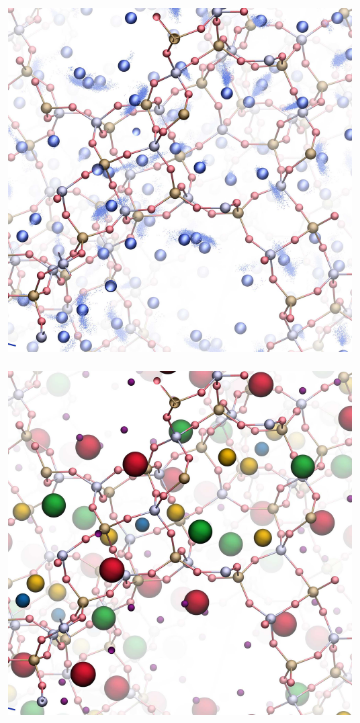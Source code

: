 \documentclass[thesis]{subfiles}
\begin{document}
\begin{otherlanguage}{french}
\begin{figure}[ht]
	\hfill\begin{subfigure}{0.45\columnwidth}
		\centering
		\includegraphics[width=0.95\columnwidth]{figures/cations/FAU1_density_Na.jpg}
	\end{subfigure}\hfill%
	\begin{subfigure}{0.45\columnwidth}
		\centering
		\includegraphics[width=0.95\columnwidth]{figures/cations/FAU1_NaColors.jpg}
		\label{fig_FAU_sites}
	\end{subfigure}\hfill
	

\end{figure}
\end{otherlanguage}
\end{document}
